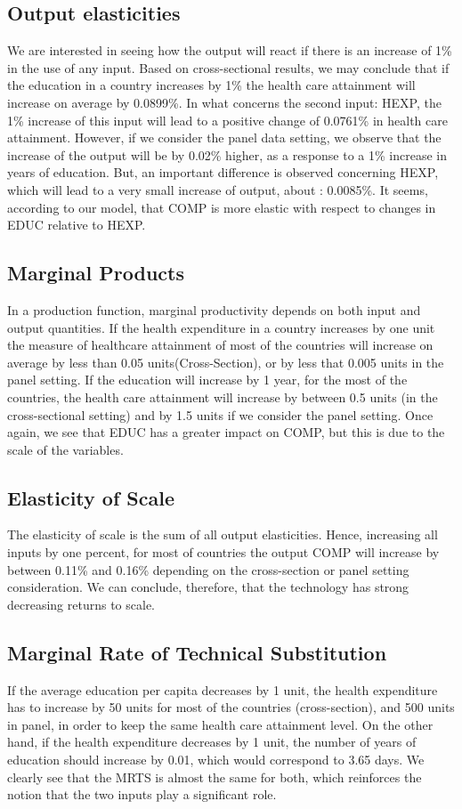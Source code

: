 \documentclass[12pt,a4paper]{article}\usepackage[]{graphicx}\usepackage[]{color}
\begin{document}
\subsection{Output elasticities}
We are interested in seeing how the output will react if there is an increase of 1\% in the use of any input. Based on cross-sectional results, we may conclude that if the education in a country increases by 1\% the health care attainment will increase on average by 0.0899\%. In what concerns the second input: HEXP, the 1\% increase of this input will lead to a positive change of 0.0761\% in health care attainment. However, if we consider the panel data setting, we observe that the increase of the output will be by 0.02\% higher, as a response to a 1\% increase in years of education. But, an important difference is observed concerning HEXP, which will lead to a very small increase of output, about : 0.0085\%. It seems, according to our model, that COMP is more elastic with respect to changes in EDUC relative to HEXP.

\subsection{Marginal Products}
In a production function, marginal productivity depends on both input and output quantities. If the health expenditure in a country increases  by one unit the measure of healthcare attainment of most of the countries will increase on average by less than 0.05 units(Cross-Section), or by less that  0.005 units in the panel setting. If the education will increase by 1 year, for the most of the countries, the health care attainment will increase by between 0.5 units (in the cross-sectional setting) and by 1.5 units if we consider the panel setting. Once again, we see that EDUC has a greater impact on COMP, but this is due to the scale of the variables.


\subsection{Elasticity of Scale}


The elasticity of scale is the sum of all output elasticities. Hence, increasing all  inputs by one percent, for most of countries
the output COMP will increase by between 0.11\% and 0.16\% depending on the cross-section or panel setting consideration.
We can conclude, therefore, that the technology has strong decreasing returns to scale.

\subsection{Marginal Rate of Technical Substitution}
If the average education per capita decreases by 1 unit, the health expenditure has to increase by 50 units for most of the countries (cross-section), and  500 units in panel, in order to keep the same health care attainment level.
On the other hand, if the health expenditure decreases by 1 unit, the number of years of education should increase by 0.01, which would correspond to 3.65 days. We clearly see that the MRTS is almost the same for both, which reinforces the notion that the two inputs play a significant role.
\end{document}
